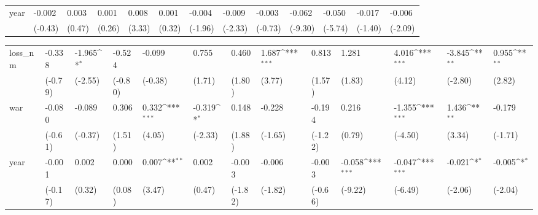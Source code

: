 \begin{tabular}{p{1.5cm} p{1.7cm} p{1.7cm} p{1.7cm} p{1.7cm} p{1.7cm} p{1.7cm} p{1.7cm} p{1.7cm} p{1.7cm} p{1.7cm} p{1.7cm} p{1.7cm}}
year            &   -0.002         &    0.003         &    0.001         &    0.008\sym{**} &    0.001         &   -0.004         &   -0.009\sym{*}  &   -0.003         &   -0.062\sym{***}&   -0.050\sym{***}&   -0.017         &   -0.006\sym{*}  \\
                &  (-0.43)         &   (0.47)         &   (0.26)         &   (3.33)         &   (0.32)         &  (-1.96)         &  (-2.33)         &  (-0.73)         &  (-9.30)         &  (-5.74)         &  (-1.40)         &  (-2.09)         \\
\end{tabular}
\def\sym#1{\ifmmode^{#1}\else\(^{#1}\)\fi}
\begin{tabular}{p{1.5cm} p{1.7cm} p{1.7cm} p{1.7cm} p{1.7cm} p{1.7cm} p{1.7cm} p{1.7cm} p{1.7cm} p{1.7cm} p{1.7cm} p{1.7cm} p{1.7cm}}
\hline
loss\_nm         &   -0.338         &   -1.965\sym{*}  &   -0.524         &   -0.099         &    0.755         &    0.460         &    1.687\sym{***}&    0.813         &    1.281         &    4.016\sym{***}&   -3.845\sym{**} &    0.955\sym{**} \\
                &  (-0.79)         &  (-2.55)         &  (-0.80)         &  (-0.38)         &   (1.71)         &   (1.80)         &   (3.77)         &   (1.57)         &   (1.83)         &   (4.12)         &  (-2.80)         &   (2.82)         \\
war             &   -0.080         &   -0.089         &    0.306         &    0.332\sym{***}&   -0.319\sym{*}  &    0.148         &   -0.228         &   -0.194         &    0.216         &   -1.355\sym{***}&    1.436\sym{**} &   -0.179         \\
                &  (-0.61)         &  (-0.37)         &   (1.51)         &   (4.05)         &  (-2.33)         &   (1.88)         &  (-1.65)         &  (-1.22)         &   (0.79)         &  (-4.50)         &   (3.34)         &  (-1.71)         \\
year            &   -0.001         &    0.002         &    0.000         &    0.007\sym{**} &    0.002         &   -0.003         &   -0.006         &   -0.003         &   -0.058\sym{***}&   -0.047\sym{***}&   -0.021\sym{*}  &   -0.005\sym{*}  \\
                &  (-0.17)         &   (0.32)         &   (0.08)         &   (3.47)         &   (0.47)         &  (-1.82)         &  (-1.82)         &  (-0.66)         &  (-9.22)         &  (-6.49)         &  (-2.06)         &  (-2.04)         \\
\end{tabular}
